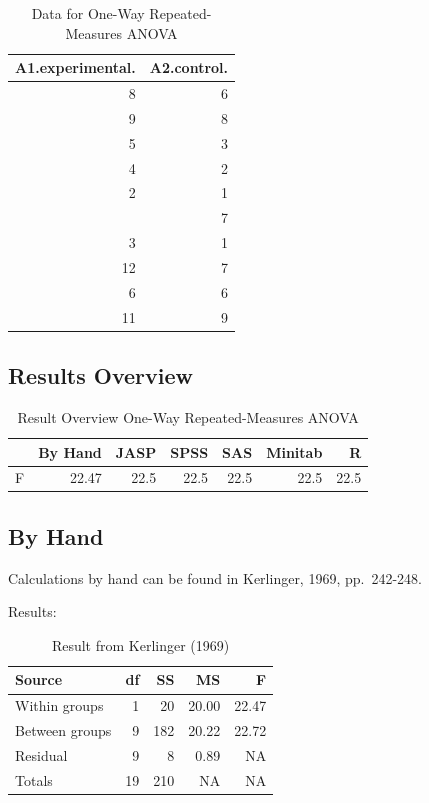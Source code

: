 \documentclass[
]{book}
\begin{document}
\begin{table}

\caption{\label{tab:unnamed-chunk-55}Data for One-Way Repeated-Measures ANOVA}
\centering
\begin{tabular}[t]{rr}
\toprule
A1.experimental. & A2.control.\\
\midrule
8 & 6\\
9 & 8\\
5 & 3\\
4 & 2\\
2 & 1\\
\addlinespace
10 & 7\\
3 & 1\\
12 & 7\\
6 & 6\\
11 & 9\\
\bottomrule
\end{tabular}
\end{table}

\hypertarget{results-overview-3}{%
\subsection{Results Overview}\label{results-overview-3}}

\begin{table}

\caption{\label{tab:unnamed-chunk-56}Result Overview One-Way Repeated-Measures ANOVA}
\centering
\begin{tabular}[t]{lrrrrrr}
\toprule
  & By Hand & JASP & SPSS & SAS & Minitab & R\\
\midrule
F & 22.47 & 22.5 & 22.5 & 22.5 & 22.5 & 22.5\\
\bottomrule
\end{tabular}
\end{table}

\hypertarget{by-hand-3}{%
\subsection{By Hand}\label{by-hand-3}}

Calculations by hand can be found in Kerlinger, 1969, pp.~242-248.

Results:

\begin{table}

\caption{\label{tab:unnamed-chunk-57}Result from Kerlinger (1969)}
\centering
\begin{tabular}[t]{lrrrr}
\toprule
Source & df & SS & MS & F\\
\midrule
Within groups & 1 & 20 & 20.00 & 22.47\\
Between groups & 9 & 182 & 20.22 & 22.72\\
Residual & 9 & 8 & 0.89 & NA\\
Totals & 19 & 210 & NA & NA\\
\bottomrule
\end{tabular}
\end{table}
\end{document}
